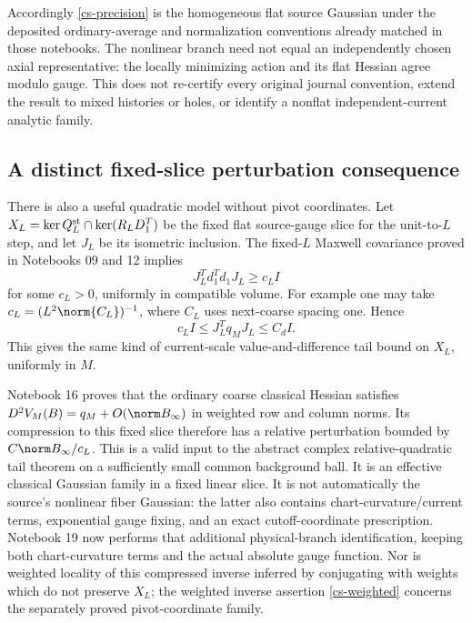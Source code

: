 Accordingly \eqref{cs-precision} is the homogeneous flat source
Gaussian under the deposited ordinary-average and normalization
conventions already matched in those notebooks. The nonlinear
branch need not equal an independently chosen axial representative:
the locally minimizing action and its flat Hessian agree modulo
gauge. This does not re-certify every original journal convention,
extend the result to mixed histories or holes, or identify a
nonflat independent-current analytic family.

\subsection{A distinct fixed-slice perturbation consequence}

There is also a useful quadratic model without pivot coordinates.
Let $X_L=\ker Q_L^{\rm st}\cap\ker(R_LD_1^T)$ be the fixed flat
source-gauge slice for the unit-to-$L$ step, and let $J_L$ be its
isometric inclusion. The fixed-$L$ Maxwell covariance proved in
Notebooks 09 and 12 implies
\[
 J_L^Td_1^Td_1J_L\ge c_LI
\]
for some $c_L>0$, uniformly in compatible volume. For example one
may take $c_L=(L^2\norm{C_L})^{-1}$, where $C_L$ uses next-coarse
spacing one. Hence
\begin{equation}\label{cs-slice-gap}
 c_LI\le J_L^Tq_MJ_L\le C_dI.
\end{equation}
This gives the same kind of current-scale value-and-difference
tail bound on $X_L$, uniformly in $M$.

Notebook 16 proves that the ordinary coarse classical Hessian
satisfies $D^2V_M(B)=q_M+O(\norm B_\infty)$ in weighted row and
column norms. Its compression to this fixed slice therefore has a
relative perturbation bounded by $C\norm B_\infty/c_L$. This is
a valid input to the abstract complex relative-quadratic tail
theorem on a sufficiently small common background ball. It is an
effective classical Gaussian family in a fixed linear slice.
It is not automatically the source's nonlinear fiber Gaussian:
the latter also contains chart-curvature/current terms, exponential
gauge fixing, and an exact cutoff-coordinate prescription.
Notebook 19 now performs that additional physical-branch
identification, keeping both chart-curvature terms and the
actual absolute gauge function.
Nor is weighted locality of this compressed inverse inferred by
conjugating with weights which do not preserve $X_L$; the weighted
inverse assertion \eqref{cs-weighted} concerns the separately
proved pivot-coordinate family.
